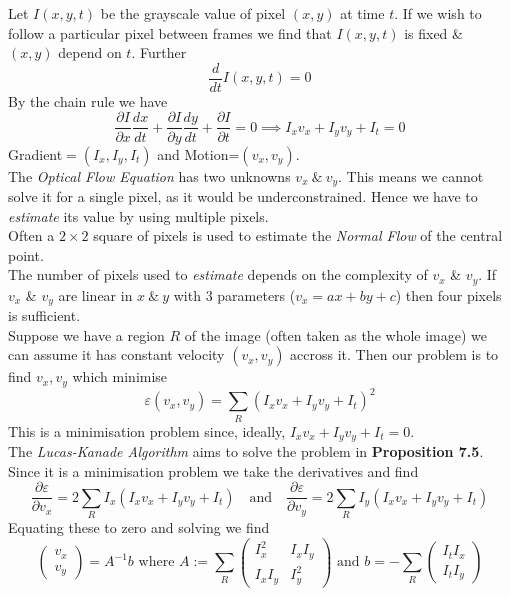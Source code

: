 \documentclass[11pt,a4paper]{article}
\begin{document}
Let $I(x,y,t)$ be the grayscale value of pixel $(x,y)$ at time $t$. If we wish to follow a particular pixel between frames we find that $I(x,y,t)$ is fixed \& $(x,y)$ depend on $t$. Further
$$\frac{d}{dt}I(x,y,t)=0$$
By the chain rule we have
$$\frac{\partial I}{\partial x}\frac{dx}{dt}+\frac{\partial I}{\partial y}\frac{dy}{dt}+\frac{\partial I}{\partial t}=0\implies I_xv_x+I_yv_y+I_t=0$$
\nb Gradient$=(I_x,I_y,I_t)$ and Motion=$(v_x,v_y)$.\\

The \textit{Optical Flow Equation} has two unknowns $v_x\ \&\ v_y$. This means we cannot solve it for a single pixel, as it would be underconstrained. Hence we have to \textit{estimate} its value by using multiple pixels.\\
Often a $2\times2$ square of pixels is used to estimate the \textit{Normal Flow} of the central point.\\
\nb The number of pixels used to \textit{estimate} depends on the complexity of $v_x$ \& $v_y$. If $v_x$ \& $v_y$ are linear in $x\ \&\ y$ with 3 parameters (\eg $v_x=ax+by+c$) then four pixels is sufficient.\\

Suppose we have a region $R$ of the image (often taken as the whole image) we can assume it has constant velocity $(v_x,v_y)$ accross it. Then our problem is to find $v_x,v_y$ which minimise
$$\varepsilon(v_x,v_y)=\sum_R\left(I_xv_x+I_yv_y+I_t\right)^2$$
\nb This is a minimisation problem since, ideally, $I_xv_x+I_yv_y+I_t=0$.\\

The \textit{Lucas-Kanade Algorithm} aims to solve the problem in \textbf{Proposition 7.5}.\\
Since it is a minimisation problem we take the derivatives and find
$$\frac{\partial\varepsilon}{\partial v_x}=2\sum_RI_x(I_xv_x+I_yv_y+I_t)\quad\text{and}\quad\frac{\partial\varepsilon}{\partial v_y}=2\sum_RI_y(I_xv_x+I_yv_y+I_t)$$
Equating these to zero and solving we find
$$\begin{pmatrix}v_x\\v_y\end{pmatrix}=A^{-1}b\text{ where }A:=\sum_R\begin{pmatrix}I_x^2&I_xI_y\\I_xI_y&I_y^2\end{pmatrix}\text{ and }b=-\sum_R\begin{pmatrix}I_tI_x\\I_tI_y\end{pmatrix}$$
\end{document}
